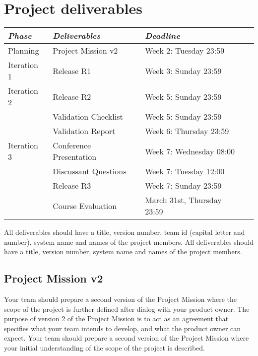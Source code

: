 \ifteknolog
\newcommand{\ITERATIONTHREE}{
 Iteration 3 & Conference Presentation & Week 7: Wednesday 08:00\\
      & Discussant Questions & Week 7: Tuesday 12:00\\
      & Release R3 & Week 7: Sunday 23:59\\
}
\else
\newcommand{\ITERATIONTHREE}{
    Iteration 3 & Release R3 & Week 7: Sunday 23:59\\
}
\fi

\section{Project deliverables}
\begin{tabular}{l |l p{5cm}  l}
{\it Phase} & {\it Deliverables} & {\it Deadline} \\
\hline
Planning & Project Mission v2& Week 2: Tuesday 23:59\\
Iteration 1 & Release R1 & Week 3: Sunday 23:59 \\
Iteration 2 & Release R2  & Week 5: Sunday 23:59\\
   & Validation Checklist & Week 5: Sunday 23:59\\
   & Validation Report & Week 6: Thursday 23:59\\
\ITERATIONTHREE
& Course Evaluation & March 31st, Thursday 23:59  \\

\end{tabular}
\vskip3mm

\ifteknolog
   \noindent All deliverables should have a title, version number, team id (capital letter and number), system name and names of the project members. 
\else
   \noindent All deliverables should have a title, version number, system name and names of the project members.
\fi

\subsection{Project Mission v2}
\ifteknolog
   Your team should prepare a second version of the Project Mission where the scope of the project is further defined after dialog with your product owner. The purpose of version 2 of the Project Mission is to act as an agreement that specifies what your team intends to develop, and what the product owner can expect.
\else
   Your team should prepare a second version of the Project Mission where your initial understanding of the scope of the project is described. 
\fi

